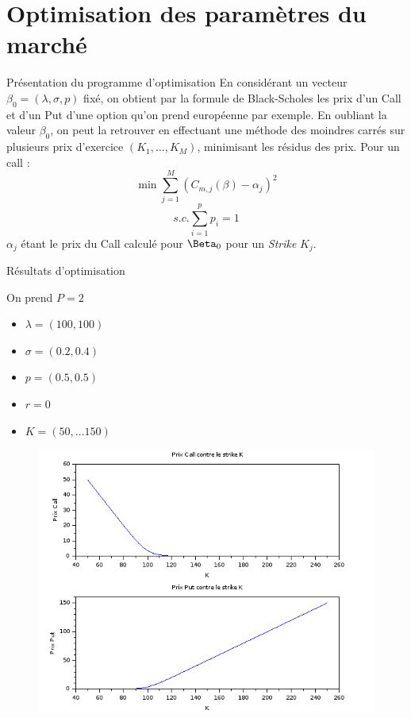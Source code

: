 \documentclass{beamer}
\begin{document}
\section{Optimisation des paramètres du marché}
\begin{frame}{Présentation du programme d'optimisation}
  En considérant un vecteur $ \beta_0 = (\lambda,\sigma,p)$ fixé, on obtient par la formule de Black-Scholes les prix d'un Call et d'un Put d'une option qu'on prend européenne par exemple.
  \newline
  En oubliant la valeur $\beta_0$, on peut la retrouver en effectuant une méthode des moindres carrés sur plusieurs prix d'exercice $(K_1,...,K_M)$, minimisant les résidus des prix. Pour un call :
  $$ \min \sum^M_{j=1} (C_{m,j}(\beta)-\alpha_j)^2 $$
  \vspace{-0.3cm}
  $$ s.c. \sum^p_{i=1}p_i = 1 $$
$\alpha_j$ étant le prix du Call calculé pour $\Beta_0$ pour un \textit{Strike} $K_j$.
\end{frame}

\begin{frame}{Résultats d'optimisation}
    \begin{minipage}{0.49\textwidth}
      On prend $P = 2$
      \begin{itemize}
        \item $\lambda = (100,100)$
        \item $\sigma = (0.2, 0.4)$
        \item $p = (0.5,0.5) $
        \item $r = 0$
        \item $K = (50,...150)$
      \end{itemize}
    \end{minipage}

    \begin{minipage}{1.49\textwidth}
    \begin{figure}[!r]
      \vspace{-3cm}
      \includegraphics[scale=0.35]{callput.png}
    \end{figure}
    \end{minipage}
\end{frame}
\end{document}
